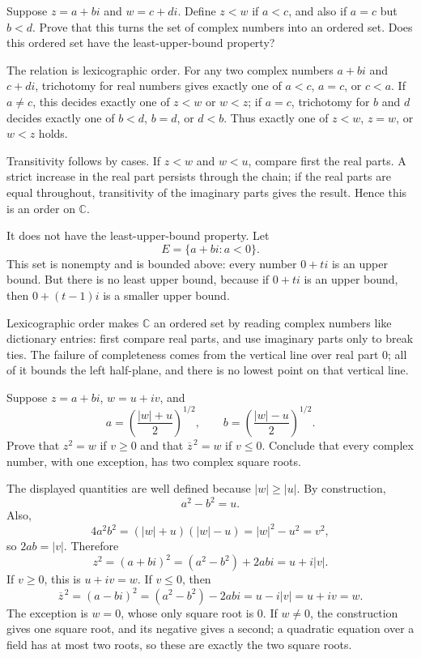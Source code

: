\documentclass[main.tex]{subfiles}
\begin{document}
Suppose $z=a+bi$ and $w=c+di$. Define $z<w$ if $a<c$, and also if $a=c$ but $b<d$. Prove that this
turns the set of complex numbers into an ordered set. Does this ordered set have the least-upper-bound
property?

\begin{SolutionBlue}
The relation is lexicographic order. For any two complex numbers $a+bi$ and $c+di$, trichotomy for
real numbers gives exactly one of $a<c$, $a=c$, or $c<a$. If $a\neq c$, this decides exactly one of
$z<w$ or $w<z$; if $a=c$, trichotomy for $b$ and $d$ decides exactly one of $b<d$, $b=d$, or $d<b$.
Thus exactly one of $z<w$, $z=w$, or $w<z$ holds.

Transitivity follows by cases. If $z<w$ and $w<u$, compare first the real parts. A strict increase in
the real part persists through the chain; if the real parts are equal throughout, transitivity of the
imaginary parts gives the result. Hence this is an order on $\mathbb C$.

It does not have the least-upper-bound property. Let
\[
E=\{a+bi:a<0\}.
\]
This set is nonempty and is bounded above: every number $0+ti$ is an upper bound. But there is no
least upper bound, because if $0+ti$ is an upper bound, then $0+(t-1)i$ is a smaller upper bound.
\end{SolutionBlue}

\begin{Reflection}
Lexicographic order makes $\mathbb C$ an ordered set by reading complex numbers like dictionary
entries: first compare real parts, and use imaginary parts only to break ties. The failure of
completeness comes from the vertical line over real part $0$; all of it bounds the left half-plane,
and there is no lowest point on that vertical line.
\end{Reflection}

Suppose $z=a+bi$, $w=u+iv$, and
\[
a=\left(\frac{|w|+u}{2}\right)^{1/2},\qquad
b=\left(\frac{|w|-u}{2}\right)^{1/2}.
\]
Prove that $z^2=w$ if $v\ge 0$ and that $\overline z^{\,2}=w$ if $v\le 0$. Conclude that every complex
number, with one exception, has two complex square roots.

\begin{SolutionBlue}
The displayed quantities are well defined because $|w|\ge |u|$. By construction,
\[
a^2-b^2=u.
\]
Also,
\[
4a^2b^2=(|w|+u)(|w|-u)=|w|^2-u^2=v^2,
\]
so $2ab=|v|$. Therefore
\[
z^2=(a+bi)^2=(a^2-b^2)+2abi=u+i|v|.
\]
If $v\ge0$, this is $u+iv=w$. If $v\le0$, then
\[
\overline z^{\,2}=(a-bi)^2=(a^2-b^2)-2abi=u-i|v|=u+iv=w.
\]
The exception is $w=0$, whose only square root is $0$. If $w\neq0$, the construction gives one square
root, and its negative gives a second; a quadratic equation over a field has at most two roots, so
these are exactly the two square roots.
\end{SolutionBlue}
\end{document}
